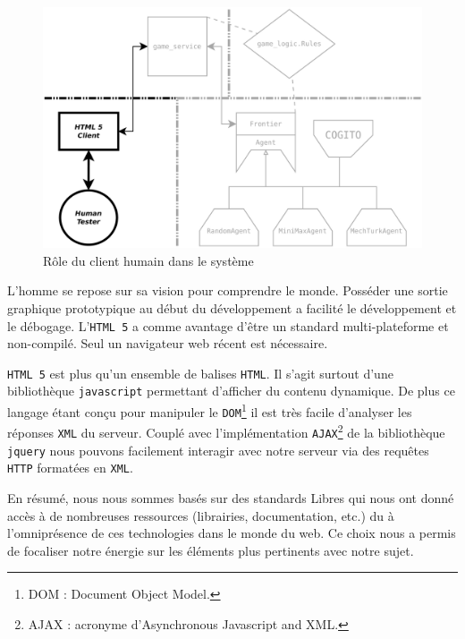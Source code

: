 \begin{figure}[H] 
\centering
\includegraphics[width=\textwidth]{files/william/archi_client_humain} 
\caption{Rôle du client humain dans le système} 
\end{figure} 

L'homme se repose sur sa vision pour comprendre le monde. Posséder une sortie graphique prototypique au début du développement a facilité le développement et le débogage. L'\texttt{HTML 5} a comme avantage d'être un standard multi-plateforme et non-compilé. Seul un navigateur web récent est nécessaire.

\og \texttt{HTML 5} \fg{} est plus qu'un ensemble de balises \texttt{HTML}. Il s'agit surtout d'une bibliothèque \texttt{javascript} permettant d'afficher du contenu dynamique. De plus ce langage étant conçu pour manipuler le \texttt{DOM}\footnote{DOM : Document Object Model.} il est très facile d'analyser les réponses \texttt{XML} du serveur. Couplé avec l'implémentation \texttt{AJAX}\footnote{AJAX : acronyme d'Asynchronous Javascript and XML.} de la bibliothèque \texttt{jquery} nous pouvons facilement interagir avec notre serveur via des requêtes \texttt{HTTP} formatées en \texttt{XML}.

En résumé, nous nous sommes basés sur des standards Libres qui nous ont donné accès à de nombreuses ressources (librairies, documentation, etc.) du à l'omniprésence de ces technologies dans le monde du web. Ce choix nous a permis de focaliser notre énergie sur les éléments plus pertinents avec notre sujet.  

